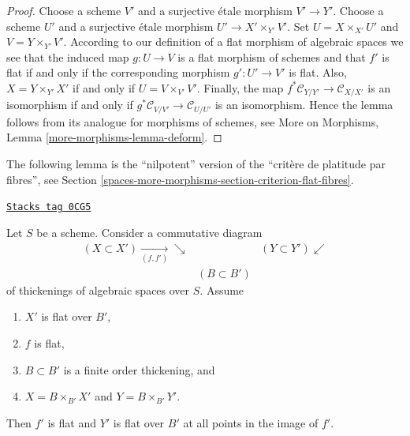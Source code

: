 \begin{proof}
Choose a scheme $V'$ and a surjective \'etale morphism $V' \to Y'$.
Choose a scheme $U'$ and a surjective \'etale morphism
$U' \to X' \times_{Y'} V'$. Set $U = X \times_{X'} U'$ and
$V = Y \times_{Y'} V'$. According to our definition of a flat morphism
of algebraic spaces we see that the induced map $g : U \to V$ is a flat
morphism of schemes and that $f'$ is flat if and only if the corresponding
morphism $g' : U' \to V'$ is flat. Also, $X = Y \times_{Y'} X'$ if and only
if $U = V \times_{V'} V'$. Finally, the map
$f^*\mathcal{C}_{Y/Y'} \to \mathcal{C}_{X/X'}$
is an isomorphism if and only if
$g^*\mathcal{C}_{V/V'} \to \mathcal{C}_{U/U'}$ is an isomorphism.
Hence the lemma follows from its analogue for morphisms of schemes, see
More on Morphisms, Lemma \ref{more-morphisms-lemma-deform}.
\end{proof}

The following lemma is the ``nilpotent'' version of the
``crit\`ere de platitude par fibres'', see
Section \ref{spaces-more-morphisms-section-criterion-flat-fibres}.

\begin{lemma}
\label{spaces-more-morphisms-lemma-flatness-morphism-thickenings}
\href{https://stacks.math.columbia.edu/tag/0CG5}{\texttt{Stacks tag 0CG5}}

Let $S$ be a scheme. Consider a commutative diagram
$$
\begin{array}{ccc}(X \subset X') \underset{(f, f')}{\longrightarrow}\searrow &  & (Y \subset Y') \swarrow \\  & (B \subset B') & \end{array}
$$
of thickenings of algebraic spaces over $S$. Assume
\begin{enumerate}
\item $X'$ is flat over $B'$,
\item $f$ is flat,
\item $B \subset B'$ is a finite order thickening, and
\item $X = B \times_{B'} X'$ and $Y = B \times_{B'} Y'$.
\end{enumerate}
Then $f'$ is flat and $Y'$ is flat over $B'$ at all points in
the image of $f'$.
\end{lemma}

